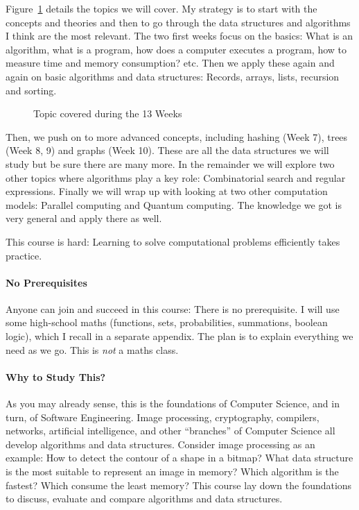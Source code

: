 \documentclass{aldast}
\begin{document}
Figure~\ref{fig:syllabus} details the topics we will cover. My
strategy is to start with the concepts and theories and then to go
through the data structures and algorithms I think are the most
relevant. The two first weeks focus on the basics: What is an
algorithm, what is a program, how does a computer executes a program,
how to measure time and memory consumption? etc. Then we apply these
again and again on basic algorithms and data structures: Records,
arrays, lists, recursion and sorting.

\begin{figure}[htbp]
  \begin{center}
    
  \end{center}
  \caption{Topic covered during the 13 Weeks}
  \label{fig:syllabus}
\end{figure}

Then, we push on to more advanced concepts, including hashing (Week
7), trees (Week 8, 9) and graphs (Week 10). These are all the data
structures we will study but be sure there are many more. In the
remainder we will explore two other topics where algorithms play a key
role: Combinatorial search and regular expressions. Finally we will
wrap up with looking at two other computation models: Parallel
computing and Quantum computing. The knowledge we got is very general
and apply there as well.

\begin{takeaway}
  This course is hard: Learning to solve computational problems
  efficiently takes practice.
\end{takeaway}

\paragraph{No Prerequisites} Anyone can join and succeed in this
course: There is no prerequisite. I will use some high-school maths
(functions, sets, probabilities, summations, boolean logic), which I
recall in a separate appendix. The plan is to explain everything we
need as we go. This is \emph{not} a maths class.

\paragraph{Why to Study This?}
As you may already sense, this is the foundations of Computer Science,
and in turn, of Software Engineering. Image processing, cryptography,
compilers, networks, artificial intelligence, and other ``branches''
of Computer Science all develop algorithms and data
structures. Consider image processing as an example: How to detect the
contour of a shape in a bitmap?  What data structure is the most
suitable to represent an image in memory? Which algorithm is the
fastest? Which consume the least memory? This course lay down the
foundations to discuss, evaluate and compare algorithms and data
structures.
\end{document}
